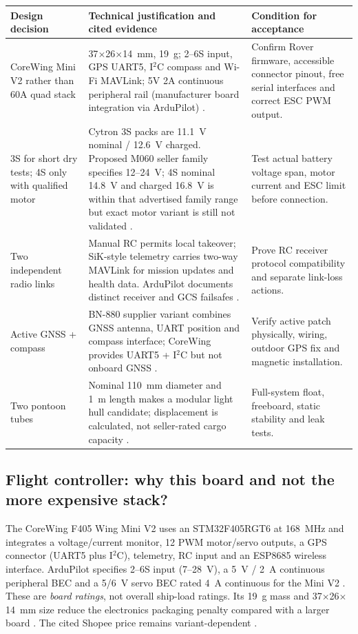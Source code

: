 \begin{tabularx}{\linewidth}{L{27mm}Y Y}
\toprule Design decision & Technical justification and cited evidence & Condition for acceptance \\\midrule
CoreWing Mini V2 rather than 60A quad stack & 37$\times$26$\times$14~mm, 19~g; 2--6S input, GPS UART5, I$^2$C compass and Wi-Fi MAVLink; 5V 2A continuous peripheral rail (manufacturer board integration via ArduPilot) \cite{coreDoc}. & Confirm Rover firmware, accessible connector pinout, free serial interfaces and correct ESC PWM output.\\
3S for short dry tests; 4S only with qualified motor & Cytron 3S packs are 11.1~V nominal / 12.6~V charged. Proposed M060 seller family specifies 12--24~V; 4S nominal 14.8~V and charged 16.8~V is within that advertised family range but exact motor variant is still not validated \cite{bat22,bat52,bat4Shopee,m060Shop}. & Test actual battery voltage span, motor current and ESC limit before connection.\\
Two independent radio links & Manual RC permits local takeover; SiK-style telemetry carries two-way MAVLink for mission updates and health data. ArduPilot documents distinct receiver and GCS failsafes \cite{rcDoc,radioDoc,failsafes}. & Prove RC receiver protocol compatibility and separate link-loss actions.\\
Active GNSS + compass & BN-880 supplier variant combines GNSS antenna, UART position and compass interface; CoreWing provides UART5 + I$^2$C but not onboard GNSS \cite{bnShop,bn880Series,coreDoc}. & Verify active patch physically, wiring, outdoor GPS fix and magnetic installation.\\
Two pontoon tubes & Nominal 110~mm diameter and 1~m length makes a modular light hull candidate; displacement is calculated, not seller-rated cargo capacity \cite{pipe,cap}. & Full-system float, freeboard, static stability and leak tests.\\
\bottomrule
\end{tabularx}

\subsection{Flight controller: why this board and not the more expensive stack?}
The CoreWing F405 Wing Mini V2 uses an STM32F405RGT6 at 168~MHz and integrates a voltage/current monitor, 12 PWM motor/servo outputs, a GPS connector (UART5 plus I$^2$C), telemetry, RC input and an ESP8685 wireless interface. ArduPilot specifies 2--6S input (7--28~V), a 5~V / 2~A continuous peripheral BEC and a 5/6~V servo BEC rated 4~A continuous for the Mini V2 \cite{coreDoc}. These are \emph{board ratings}, not overall ship-load ratings. Its 19~g mass and 37$\times$26$\times$14~mm size reduce the electronics packaging penalty compared with a larger board \cite{coreDoc}. The cited Shopee price remains variant-dependent \cite{coreShop}.

